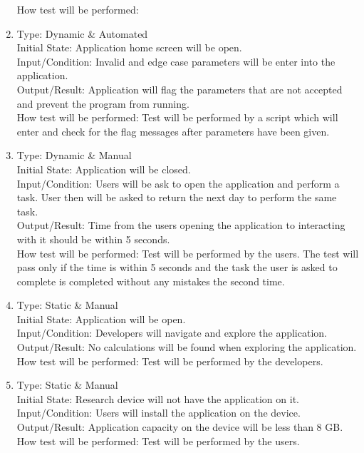 \documentclass[12pt, titlepage]{article}
\begin{document}
\begin{adjustwidth}{2.2em}{0pt}
\begin{enumerate}[{NF-UT}1.]

How test will be performed: 

    \item Type: Dynamic \& Automated\\
    Initial State: Application home screen will be open.\\
    Input/Condition: Invalid and edge case parameters will be enter into the application.\\
    Output/Result: Application will flag the parameters that are not accepted and prevent the program from running.\\
    How test will be performed: Test will be performed by a script which will enter and check for the flag messages after parameters have been given.

    \item Type: Dynamic \& Manual\\
    Initial State: Application will be closed.\\
    Input/Condition: Users will be ask to open the application and perform a task. User then will be asked to return the next day to perform the same task.\\
    Output/Result: Time from the users opening the application to interacting with it should be within 5 seconds.\\
    How test will be performed: Test will be performed by the users. The test will pass only if the time is within 5 seconds and the task the user is asked to complete is completed without any mistakes the second time.

    \item Type: Static \& Manual\\
    Initial State: Application will be open.\\
    Input/Condition: Developers will navigate and explore the application.\\
    Output/Result: No calculations will be found when exploring the application. \\
    How test will be performed: Test will be performed by the developers.

    \item Type: Static \& Manual\\
    Initial State: Research device will not have the application on it.\\
    Input/Condition: Users will install the application on the device.\\
    Output/Result: Application capacity on the device will be less than 8 GB.\\
    How test will be performed: Test will be performed by the users.


\end{enumerate}
\end{adjustwidth}
\end{document}
